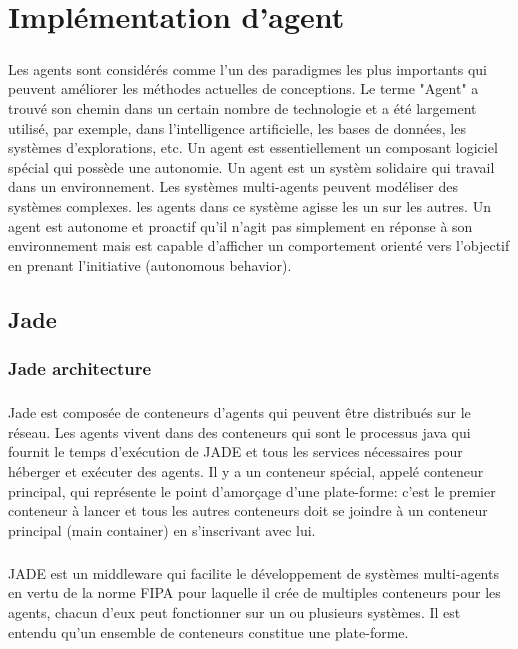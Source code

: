 \chapter{ Implémentation d'agent }
\label{Implementation_d_agent}
\paragraph{}
Les agents sont considérés comme l'un des paradigmes les plus importants qui peuvent améliorer les méthodes actuelles de conceptions. Le terme "Agent" a trouvé son chemin dans un certain nombre de technologie et a été largement utilisé, par exemple, dans l'intelligence artificielle, les bases de données, les systèmes d'explorations, etc. Un agent est essentiellement un composant logiciel spécial qui possède une autonomie. Un agent est un systèm solidaire qui travail dans un environnement. Les systèmes multi-agents peuvent modéliser des systèmes complexes. les agents dans ce système agisse les un sur les autres. Un agent est autonome et proactif qu'il n'agit pas simplement en réponse à son environnement mais est capable d'afficher un comportement orienté vers l'objectif en prenant l'initiative (autonomous behavior).

\section{ Jade }
\subsection{Jade architecture}
\paragraph{}
Jade est composée de conteneurs d'agents qui peuvent être distribués sur le réseau. Les agents vivent dans des conteneurs qui sont le processus java qui fournit le temps d'exécution de JADE et tous les services nécessaires pour héberger et exécuter des agents. Il y a un conteneur spécial, appelé conteneur principal, qui représente le point d'amorçage d'une plate-forme: c'est le premier conteneur à lancer et tous les autres conteneurs doit se joindre à un conteneur principal (main container) en s'inscrivant avec lui.
\paragraph{}
JADE est un middleware qui facilite le développement de systèmes multi-agents en vertu de la norme FIPA pour laquelle il crée de multiples conteneurs pour les agents, chacun d'eux peut fonctionner sur un ou plusieurs systèmes. Il est entendu qu'un ensemble de conteneurs constitue une plate-forme.

